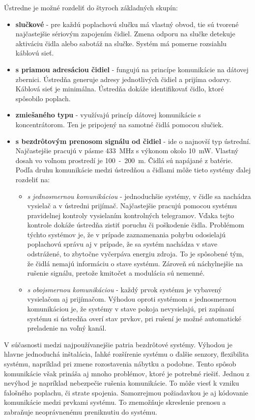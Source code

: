Ústredne je možné rozdeliť do štyroch základných skupín:
\begin{itemize}
    \item \textbf{slučkové} - pre každú poplachovú slučku má vlastný obvod, tie sú tvorené najčastejšie sériovým zapojením čidiel. Zmena odporu na slučke detekuje aktiváciu čidla alebo sabotáž na slučke. Systém má pomerne rozsiahlu káblovú sieť.
    \item \textbf{s priamou adresáciou čidiel} - fungujú na princípe komunikácie na dátovej zbernici. Ústredňa generuje adresy jednotlivých čidiel a prijíma odozvy. Káblová sieť je minimálna. Ústredňa dokáže identifikovať čidlo, ktoré spôsobilo poplach.
    \item \textbf{zmiešaného typu} - využívajú princíp dátovej komunikácie s koncentrátorom. Ten je pripojený na samotné čidlá pomocou slučiek.
    \item \textbf{s bezdrôtovým prenosom signálu od čidiel} - ide o najnovší typ ústrední. Najčastejšie pracujú v pásme 433~MHz s výkonom okolo 10~mW. Vlastný dosah vo voľnom prostredí je 100~-~200~m. Čidlá sú napájané z batérie.
    Podľa druhu komunikácie medzi ústredňou a čidlami môže tieto systémy ďalej rozdeliť na:
    \begin{itemize}
        \item \textit{s jednosmernou komunikáciou} - jednoduchšie systémy, v čidle sa nachádza vysielač a v ústredni prijímač. Najčastejšie pracujú pomocou systému pravidelnej kontroly vysielaním kontrolných telegramov. Vďaka tejto kontrole dokáže ústredňa zistiť poruchu či poškodenie čidla. Problémom týchto systémov je, že v prípade zaznamenania pohybu odosielajú poplachovú správu aj v prípade, že sa systém nachádza v stave odstrážené, to zbytočne vyčerpáva energiu zdroja. To je spôsobené tým, že čidlá nemajú informáciu o stave systému. Zároveň sú náchylnejšie na rušenie signálu, pretože kmitočet a modulácia sú nemenné.
        \item \textit{s obojsmernou komunikáciou} - každý prvok systému je vybavený vysielačom aj prijímačom. Výhodou oproti systémom s jednosmernou komunikáciou je, že systémy v stave pokoja nevysielajú, pri zapínaní systému si ústredňa overí stav prvkov, pri rušení je možné automatické preladenie na voľný kanál.
    \end{itemize}
\end{itemize}

V súčasnosti medzi najpoužívanejšie patria bezdrôtové systémy. Výhodou je hlavne jednoduchá inštalácia, ľahké rozšírenie systému o ďalšie senzory, flexibilita systému, napríklad pri zmene rozostavenia nábytku a podobne. Tento spôsob komunikácie však prináša aj mnoho problémov, ktoré je potrebné riešiť. Jednou z nevýhod je napríklad nebezpečie rušenia komunikácie. To môže viesť k vzniku falošného poplachu, či strate spojenia. Samozrejmou požiadavkou je aj kódovanie komunikácie medzi prvkami systému. To znemožňuje skreslenie prenosu a zabraňuje neoprávnenému preniknutiu do systému.\cite{Krecek}

